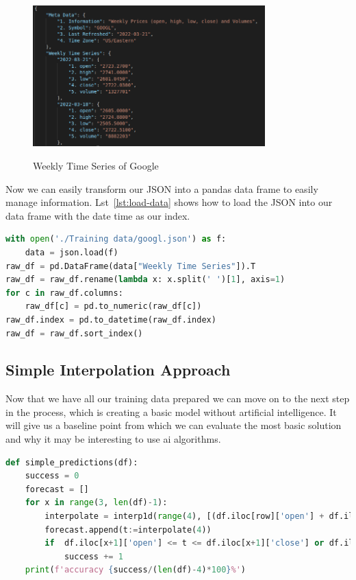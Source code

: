 \begin{figure}[H]
    \centering
    \caption{Weekly Time Series of Google}
    \includegraphics[width=0.8\textwidth]{figures/train data.png}
    \label{fig:training-data}
\end{figure}

Now we can easily transform our JSON into a pandas data frame to easily manage information. Lst~\ref{lst:load-data} shows how to load the JSON into our data frame with the date time as our index.

\begin{lstlisting}[language=python,caption=Load Data Into a Pandas Data Frame,label={lst:load-data}]
with open('./Training data/googl.json') as f:
    data = json.load(f)
raw_df = pd.DataFrame(data["Weekly Time Series"]).T
raw_df = raw_df.rename(lambda x: x.split(' ')[1], axis=1)
for c in raw_df.columns:
    raw_df[c] = pd.to_numeric(raw_df[c])
raw_df.index = pd.to_datetime(raw_df.index)
raw_df = raw_df.sort_index()
\end{lstlisting}

\subsection{Simple Interpolation Approach}

Now that we have all our training data prepared we can move on to the next step in the process, which is creating a basic model without artificial intelligence. It will give us a baseline point from which we can evaluate the most basic solution and why it may be interesting to use \gls{ai} algorithms.

\begin{lstlisting}[language=python,caption=Price Extrapolation,label={lst:base-model}]
def simple_predictions(df):
    success = 0
    forecast = []
    for x in range(3, len(df)-1):
        interpolate = interp1d(range(4), [(df.iloc[row]['open'] + df.iloc[row]['close']) / 2 for row in range(x-3, x+1)], kind='slinear', fill_value='extrapolate', bounds_error=False)
        forecast.append(t:=interpolate(4))
        if  df.iloc[x+1]['open'] <= t <= df.iloc[x+1]['close'] or df.iloc[x+1]['open'] >= t >= df.iloc[x+1]['close']:
            success += 1
    print(f'accuracy {success/(len(df)-4)*100}%')
\end{lstlisting}

